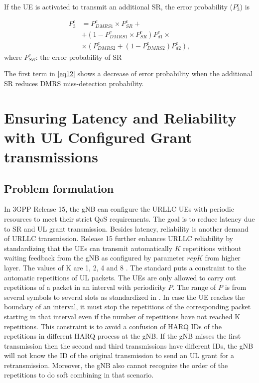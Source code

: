 \documentclass{ieeeaccess}
\begin{document}
If the UE is activated to transmit an additional SR, the error probability ($ P^{e}_{3}$) is 

\begin{equation}
\begin{split}
 P^{e}_{3} &= P^{e}_{DMRS1}\times P^{e}_{SR} + \\
        &+ (1-P^{e}_{DMRS1}\times P^{e}_{SR})P^{e}_{d1}\times\\
        &\times(P^{e}_{DMRS2} + (1-P^{e}_{DMRS2})P^{e}_{d2}),\label{eq12}   
\end{split}
\end{equation}
where $P^{e}_{SR}$: the error probability of SR

The first term in \eqref{eq12} shows a decrease of error probability when the additional SR reduces DMRS miss-detection probability.

\section{Ensuring Latency and Reliability with UL Configured Grant transmissions}\label{III}
\subsection{Problem formulation}

In 3GPP Release 15, the gNB can configure the URLLC UEs with periodic resources to meet their strict QoS requirements. The goal is to reduce latency due to SR and UL grant transmission. Besides latency, reliability is another demand of URLLC transmission. Release 15 further enhances URLLC reliability by standardizing that the UEs can transmit automatically $K$ repetitions without waiting feedback from the gNB as configured by parameter $repK$ from higher layer. The values of K are 1, 2, 4 and 8 \cite{ref6}.
The standard puts a constraint to the automatic repetitions of UL packets. The UEs are only allowed to carry out repetitions of a packet in an interval with periodicity $P$. The range of $P$ is from several symbols to several slots as standardized in \cite{ref6}. In case the UE reaches the boundary of an interval, it must stop the repetitions of the corresponding packet starting in that interval even if the number of repetitions have not reached K repetitions. This constraint is to avoid a confusion of HARQ IDs of the repetitions in different HARQ process at the gNB. If the gNB misses the first transmission then the second and third transmissions have different IDs, the gNB will not know the ID of the original transmission to send an UL grant for a retransmission. Moreover, the gNB also cannot recognize the order of the repetitions to do soft combining in that scenario. 
\end{document}
